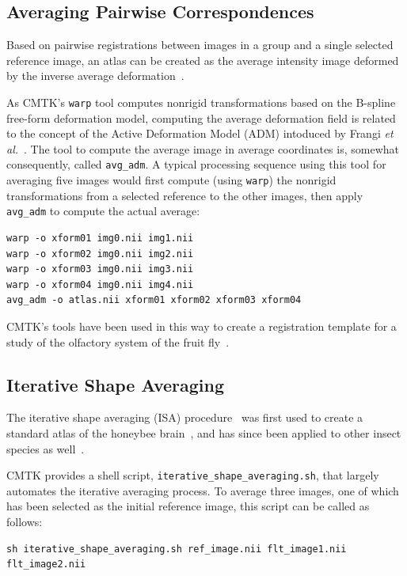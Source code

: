 \documentclass{InsightArticle}
\begin{document}
\subsection{Averaging Pairwise Correspondences}

Based on pairwise registrations between images in a group and a single selected
reference image, an atlas can be created as the average intensity image
deformed by the inverse average deformation~\cite{GuimMeunThir:2000}.

As CMTK's {\tt warp} tool computes nonrigid transformations based on the
B-spline free-form deformation model, computing the average deformation field
is related to the concept of the Active Deformation Model (ADM) intoduced by
Frangi {\em et al.\/}~\cite{FranRuecSchn:2001,FranRuecSchn:2002}. The tool to
compute the average image in average coordinates is, somewhat consequently,
called {\tt avg\_adm}. A typical processing sequence using this tool for
averaging five images would first compute (using {\tt warp}) the nonrigid
transformations from a selected reference to the other images, then apply {\tt
avg\_adm} to compute the actual average:
\begin{verbatim}
warp -o xform01 img0.nii img1.nii
warp -o xform02 img0.nii img2.nii
warp -o xform03 img0.nii img3.nii
warp -o xform04 img0.nii img4.nii
avg_adm -o atlas.nii xform01 xform02 xform03 xform04
\end{verbatim}

CMTK's tools have been used in this way to create a registration template for
a study of the olfactory system of the fruit fly~\cite{JeffPottChan:2007}.

\subsection{Iterative Shape Averaging}

The iterative shape averaging (ISA) procedure~\cite{RohlBranMaur:2001} was
first used to create a standard atlas of the honeybee
brain~\cite{BranRohlRyba:2005}, and has since been applied to other insect
species as well~\cite{KuryRohlKrof:2008,KvelLofaRyba:2009}.

CMTK provides a shell script, {\tt iterative\_shape\_averaging.sh}, that
largely automates the iterative averaging process. To average three images,
one of which has been selected as the initial reference image, this script can
be called as follows:
\begin{verbatim}
sh iterative_shape_averaging.sh ref_image.nii flt_image1.nii flt_image2.nii
\end{verbatim}
\end{document}
